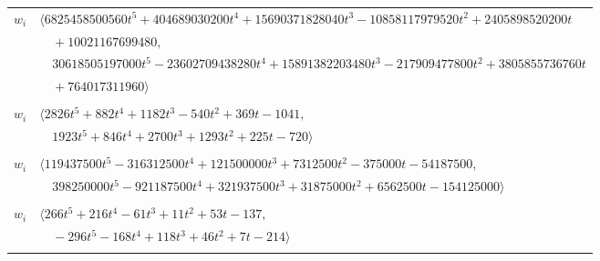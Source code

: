 \documentclass[11pt]{article}
\begin{document}
\begin{longtable}{@{}ll@{}}
$w_i$ & $\langle 6825458500560t^{5}+404689030200t^{4}+15690371828040t^{3}-10858117979520t^{2}+2405898520200t$\\
 & $\quad +10021167699480,$\\
 & $\quad 30618505197000t^{5}-23602709438280t^{4}+15891382203480t^{3}-217909477800t^{2}+3805855736760t$\\
 & $\quad +764017311960\rangle$\\
\addlinespace[2pt]
\multicolumn{2}{@{}p{0.97\textwidth}@{}}{$i=49$, $D_i=1$, $\rho_{ij}$: $2{:}1, \allowbreak 3{:}1, \allowbreak 5{:}2, \allowbreak 12{:}1, \allowbreak 18{:}2, \allowbreak 23{:}2, \allowbreak 25{:}2, \allowbreak 26{:}1, \allowbreak 28{:}2, \allowbreak 33{:}1, \allowbreak 34{:}2, \allowbreak 35{:}2, \allowbreak 42{:}2, \allowbreak 47{:}2, \allowbreak 54{:}1$}\\
$w_i$ & $\langle 2826t^{5}+882t^{4}+1182t^{3}-540t^{2}+369t-1041,$\\
 & $\quad 1923t^{5}+846t^{4}+2700t^{3}+1293t^{2}+225t-720\rangle$\\
\addlinespace[2pt]
\multicolumn{2}{@{}p{0.97\textwidth}@{}}{$i=50$, $D_i=137500$, $\rho_{ij}$: $9{:}1, \allowbreak 17{:}1, \allowbreak 19{:}2, \allowbreak 22{:}1, \allowbreak 23{:}1, \allowbreak 26{:}2, \allowbreak 28{:}2, \allowbreak 29{:}1, \allowbreak 30{:}1, \allowbreak 41{:}1, \allowbreak 44{:}2, \allowbreak 52{:}1, \allowbreak 54{:}1, \allowbreak 56{:}1, \allowbreak 58{:}1$}\\
$w_i$ & $\langle 119437500t^{5}-316312500t^{4}+121500000t^{3}+7312500t^{2}-375000t-54187500,$\\
 & $\quad 398250000t^{5}-921187500t^{4}+321937500t^{3}+31875000t^{2}+6562500t-154125000\rangle$\\
\addlinespace[2pt]
\multicolumn{2}{@{}p{0.97\textwidth}@{}}{$i=51$, $D_i=1$, $\rho_{ij}$: $1{:}2, \allowbreak 13{:}2, \allowbreak 14{:}2, \allowbreak 16{:}1, \allowbreak 17{:}1, \allowbreak 23{:}2, \allowbreak 28{:}1, \allowbreak 30{:}2, \allowbreak 37{:}2, \allowbreak 40{:}1, \allowbreak 47{:}2, \allowbreak 48{:}2$}\\
$w_i$ & $\langle 266t^{5}+216t^{4}-61t^{3}+11t^{2}+53t-137,$\\
 & $\quad -296t^{5}-168t^{4}+118t^{3}+46t^{2}+7t-214\rangle$\\
\addlinespace[2pt]
\multicolumn{2}{@{}p{0.97\textwidth}@{}}{$i=52$, $D_i=17432758224$, $\rho_{ij}$: $9{:}2, \allowbreak 13{:}2, \allowbreak 18{:}2, \allowbreak 19{:}2, \allowbreak 20{:}2, \allowbreak 21{:}1, \allowbreak 22{:}1, \allowbreak 24{:}1, \allowbreak 27{:}2, \allowbreak 30{:}2, \allowbreak 35{:}1, \allowbreak 36{:}2, \allowbreak 39{:}2, \allowbreak 43{:}1, \allowbreak 50{:}2, \allowbreak 54{:}2, \allowbreak 56{:}1$}\\

\end{longtable}
\end{document}
